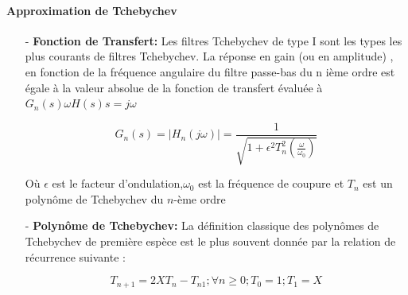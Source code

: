 \documentclass[conference,onecolumn]{IEEEtran}
\begin{document}
\paragraph{Approximation de Tchebychev}
\hfill
\medskip
\begin{itemize}
    \item[-] \textbf{Fonction de Transfert:}
    Les filtres Tchebychev de type I sont les types les plus courants de filtres Tchebychev. La réponse en gain (ou en amplitude) , en fonction de la fréquence angulaire du filtre passe-bas du n ième ordre est égale à la valeur absolue de la fonction de transfert évaluée à $G_n(s)\omega H(s)s = j\omega$

        \begin{equation}
            G_n(s) = |H_n(j\omega)| = \frac{1}{\sqrt{1 + \epsilon^2T_n^2(\frac{\omega}{\omega_0})}}
        \end{equation}

        Où $\epsilon$ est le facteur d'ondulation,$\omega_0$ est la fréquence de coupure et $T_n$ est un polynôme de Tchebychev du $n$-ème ordre
    
        \item[-] \textbf{Polynôme de Tchebychev:}
        La définition classique des polynômes de Tchebychev de première espèce est le plus souvent donnée par la relation de récurrence suivante :

            \begin{equation}
                T_{n+1} = 2XT_n - T_{n1}; \forall n \geq 0; T_0 = 1;  T_1 = X
            \end{equation}
 
\end{itemize}
\end{document}
